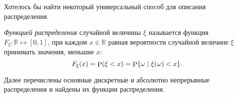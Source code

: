 Хотелось бы найти некоторый универсальный способ  для описания распределения.

\begin{to_def}
    \textit{Функцией распределения} случайной величины $\xi$ называется функция $F_\xi \colon  \mathbb{R} \mapsto [0, 1]$, при каждом $x \in \mathbb{R}$ равная вероятности случайной величине $\xi$ принимать значения, меньшие $x$:
    \begin{equation*}
        F_\xi (x) = \P (\xi < x) = \P \{\omega \mid \xi (\omega) < x\}.
    \end{equation*}
\end{to_def}

Далее перечислены основные дискретные и абсолютно непрерывные распределения и найдены их функции распределения.